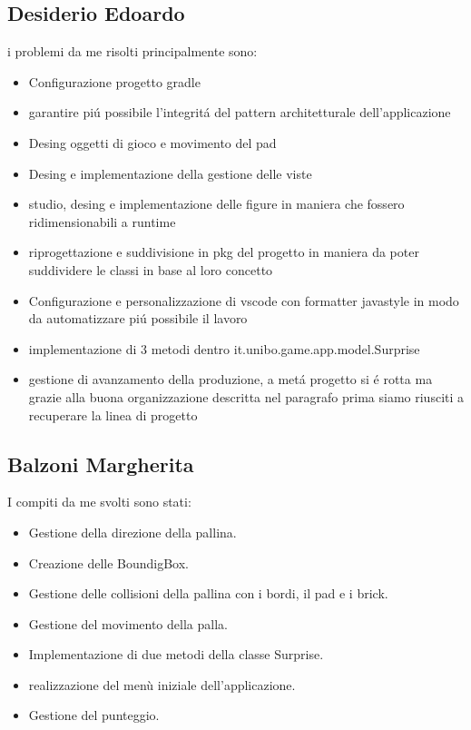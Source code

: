 \documentclass[a4paper,12pt]{report}
\begin{document}
\subsection{Desiderio Edoardo}
i problemi da me risolti principalmente sono:
\begin{itemize}
    \item Configurazione progetto gradle
    \item garantire piú possibile l'integritá del pattern architetturale dell'applicazione
    \item Desing oggetti di gioco e movimento del pad
    \item Desing  e implementazione della gestione delle viste
    \item studio, desing e implementazione delle figure in maniera che fossero ridimensionabili a runtime
    \item riprogettazione e suddivisione in pkg del progetto in maniera da poter suddividere le classi in base
          al loro concetto
    \item Configurazione e personalizzazione di vscode con formatter javastyle in modo da automatizzare piú possibile il lavoro
    \item implementazione di 3 metodi dentro it.unibo.game.app.model.Surprise
    \item gestione di avanzamento della produzione, a metá progetto si é rotta ma grazie alla buona organizzazione
          descritta nel paragrafo prima siamo riusciti a recuperare la linea di progetto
\end{itemize}
\subsection{Balzoni Margherita}
I compiti da me svolti sono stati:
\begin{itemize}
    \item Gestione della direzione della pallina.
    \item Creazione delle BoundigBox.
    \item Gestione delle collisioni della pallina con i bordi, il pad e i brick.
    \item Gestione del movimento della palla.
    \item Implementazione di due metodi della classe Surprise.
    \item realizzazione del menù iniziale dell'applicazione.
    \item Gestione del punteggio.
\end{itemize}
\end{document}
